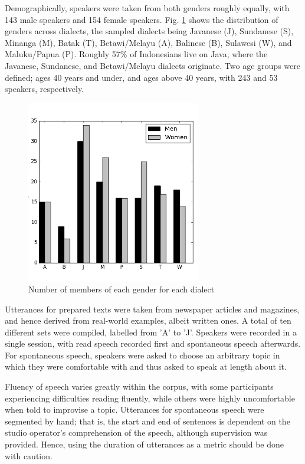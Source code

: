 \documentclass[conference]{IEEEtran}
\begin{document}
Demographically, speakers were taken from both genders roughly equally, with 143 male speakers and 154 female speakers.
Fig. \ref{demographics1} shows the distribution of genders across dialects, the sampled dialects being Javanese (J), Sundanese (S), Minanga (M), Batak (T), Betawi/Melayu (A), Balinese (B), Sulawesi (W), and Maluku/Papua (P).
Roughly 57\% of Indonesians live on Java, where the Javanese, Sundanese, and Betawi/Melayu dialects originate.
Two age groups were defined; ages 40 years and under, and ages above 40 years, with 243 and 53 speakers, respectively.

\begin{figure}[!htb]
\centering
\includegraphics[width=3.0in]{demographics1_bw}
\caption{Number of members of each gender for each dialect}
\label{demographics1}
\end{figure}

Utterances for prepared texts were taken from newspaper articles and magazines, and hence derived from real-world examples, albeit written ones.
A total of ten different sets were compiled, labelled from 'A' to 'J'.
Speakers were recorded in a single session, with read speech recorded first and spontaneous speech afterwards.
For spontaneous speech, speakers were asked to choose an arbitrary topic in which they were comfortable with and thus asked to speak at length about it.

Fluency of speech varies greatly within the corpus, with some participants experiencing difficulties reading fluently, while others were highly uncomfortable when told to improvise a topic.
Utterances for spontaneous speech were segmented by hand; that is, the start and end of sentences is dependent on the studio operator's comprehension of the speech, although supervision was provided.
Hence, using the duration of utterances as a metric should be done with caution.
\end{document}
